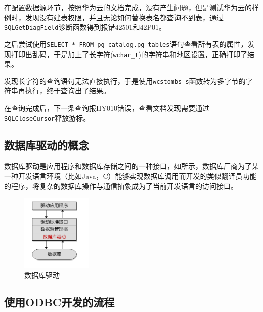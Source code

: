 \documentclass[lang=cn,11pt,a4paper,cite=authornum]{paper}
\begin{document}
在配置数据源环节，按照华为云的文档完成，没有产生问题，但是测试华为云的样例时，发现没有建表权限，并且无论如何替换表名都查询不到表，通过\texttt{SQLGetDiagField}诊断函数得到报错42501和42P01。

之后尝试使用\texttt{SELECT * FROM pg_catalog.pg_tables}语句查看所有表的属性，发现打印出乱码，于是加上了长字符(\texttt{wchar_t})的字符串和地区设置，正确打印了结果。

发现长字符的查询语句无法直接执行，于是使用\texttt{wcstombs_s}函数转为多字节的字符串再执行，终于查询出了结果。

在查询完成后，下一条查询报HY010错误，查看文档发现需要通过\texttt{SQLCloseCursor}释放游标。

\subsection{数据库驱动的概念}

数据库驱动是应用程序和数据库存储之间的一种接口，如所示，数据库厂商为了某一种开发语言环境（比如Java，C）能够实现数据库调用而开发的类似翻译员功能的程序，将复杂的数据库操作与通信抽象成为了当前开发语言的访问接口。

\begin{figure}[!htb]
    \centering
    \includegraphics[width=0.3\textwidth]{./images/driver.png}
    \caption{数据库驱动\label{fig:driver}}
\end{figure}

\subsection{使用ODBC开发的流程}
\end{document}
